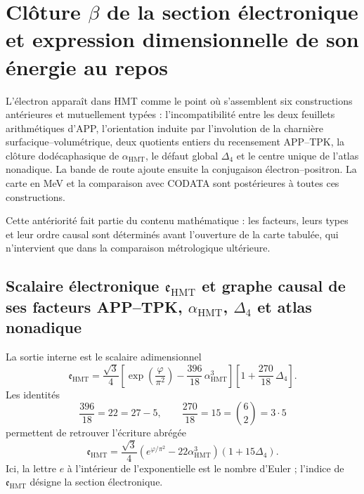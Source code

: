 \section{Clôture \(\beta\) de la section électronique et expression dimensionnelle de son énergie au repos}
\label{chap:biografia-electron-rev6}

L'électron apparaît dans HMT comme le point où s'assemblent six
constructions antérieures et mutuellement typées : l'incompatibilité entre
les deux feuillets arithmétiques d'APP, l'orientation induite par l'involution
de la charnière surfacique--volumétrique, deux quotients entiers du recensement APP--TPK,
la clôture
dodécaphasique de \(\alpha_{\mathrm{HMT}}\), le défaut global
\(\Delta_4\) et le centre unique de l'atlas nonadique. La bande de route ajoute
ensuite la conjugaison électron--positron. La carte en MeV et la comparaison
avec CODATA sont postérieures à toutes ces constructions.

Cette antériorité fait partie du contenu mathématique : les facteurs, leurs
types et leur ordre causal sont déterminés avant l'ouverture de la carte tabulée, qui
n'intervient que dans la comparaison métrologique ultérieure.

\subsection{Scalaire électronique \(\mathfrak e_{\mathrm{HMT}}\) et graphe causal de ses facteurs APP–TPK, \(\alpha_{\mathrm{HMT}}\), \(\Delta_4\) et atlas nonadique}

La sortie interne est le scalaire adimensionnel
\begin{equation}
 \label{eq:electron-holografico-rev6}
 \boxed{
 \mathfrak e_{\mathrm{HMT}}
 =
 \frac{\sqrt3}{4}
 \left[
 \exp\!\left(\frac{\varphi}{\pi^2}\right)
 -\frac{396}{18}\,\alpha_{\mathrm{HMT}}^3
 \right]
 \left[
 1+\frac{270}{18}\,\Delta_4
 \right].}
\end{equation}
Les identités
\[
 \frac{396}{18}=22=27-5,
 \qquad
 \frac{270}{18}=15=\binom62=3\cdot5
 \]
permettent de retrouver l'écriture abrégée
\[
 \mathfrak e_{\mathrm{HMT}}
 =
 \frac{\sqrt3}{4}
 \left(e^{\varphi/\pi^2}-22\alpha_{\mathrm{HMT}}^3\right)
 (1+15\Delta_4).
\]
Ici, la lettre \(e\) à l'intérieur de l'exponentielle est le nombre d'Euler ;
l'indice de \(\mathfrak e_{\mathrm{HMT}}\) désigne la section électronique.

